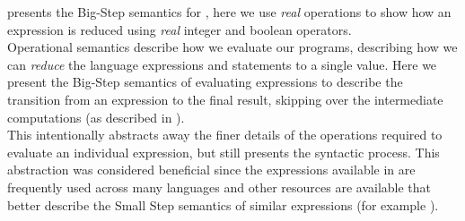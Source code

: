  presents the Big-Step semantics for \thePolicyLang, here we use \emph{real} operations to show how an expression is reduced using \emph{real} integer and boolean operators.\\
Operational semantics describe how we evaluate our programs, describing how we can \emph{reduce} the \thePolicyLang language expressions and statements to a single value. Here we present the Big-Step semantics of evaluating expressions to describe the transition from an expression to the final result, skipping over the intermediate computations (as described in \citet{Myers2007}).\\
This intentionally abstracts away the finer details of the operations required to evaluate an individual expression, but still presents the syntactic process. This abstraction was considered beneficial since the expressions available in \thePolicyLang are frequently used across many languages and other resources are available that better describe the Small Step semantics of similar expressions (for example \citet{Sewell2009, Unknown2015}).
